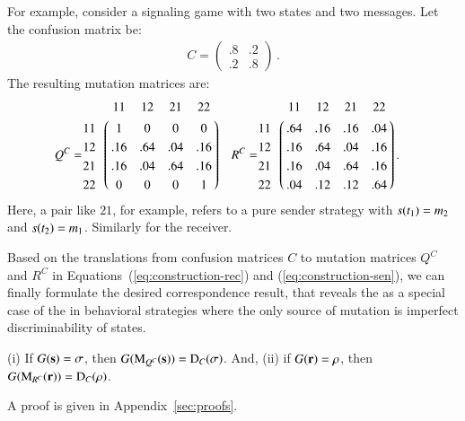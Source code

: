 For example, consider a signaling game with two states and two
messages. Let the confusion matrix be:
\begin{align*}
  C=
  \begin{pmatrix}
    .8 & .2 \\
    .2 & .8 
  \end{pmatrix}\,.
\end{align*}
The resulting mutation matrices are:
\begin{align*}
Q^C & = \bordermatrix{ ~ & 11 & 12 & 21 & 22 \cr
                      11 & 1 & 0 & 0 & 0 \cr
                      12 & .16 & .64 & .04 & .16 \cr
                      21 & .16 & .04 & .64 & .16 \cr
                      22 & 0 & 0 & 0 & 1 \cr}
&                    
  R^C & = \bordermatrix{ ~ & 11 & 12 & 21 & 22 \cr
                      11 & .64 & .16 & .16 & .04 \cr
                      12 & .16 & .64 & .04 & .16 \cr
                      21 & .16 & .04 & .64 & .16 \cr
                      22 & .04 & .12 & .12 & .64 \cr}\,.
\end{align*}
Here, a pair like $21$, for example, refers to a pure sender strategy
with $s(t_1)=m_2$ and $s(t_2) =
m_1$. Similarly for the receiver.

Based on the translations from confusion matrices $C$ to mutation
matrices $Q^C$ and $R^C$ in Equations~(\ref{eq:construction-rec}) and
(\ref{eq:construction-sen}), we can finally formulate the
desired correspondence result, that reveals the \rdd as a special case
of the \rmd in behavioral strategies where the only source of mutation is
imperfect discriminability of states.

\begin{theorem}
  \label{thm:Correspondence}
  (i) If $G(\mathrm{\mathbf{s}}) = \sigma$, then $G(\mathrm{M}_{Q^C}(\mathrm{\mathbf{s}})) =
  \mathrm{D}_C(\sigma)$. And, (ii) if $G(\mathrm{\mathbf{r}}) = \rho$, then
  $G(\mathrm{M}_{R^C}(\mathrm{\mathbf{r}})) = \mathrm{D}_C(\rho)$.
\end{theorem}

\noindent A proof is given in Appendix~\ref{sec:proofs}.




